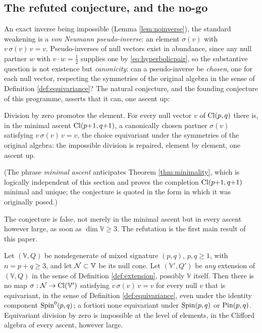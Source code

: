 \subsection{The refuted conjecture, and the no-go}\label{sec:nogo}

An exact inverse being impossible (Lemma \ref{lem:noinverse}), the standard weakening is a \emph{von Neumann pseudo-inverse}: an element $\sigma(v)$ with $v\,\sigma(v)\,v = v$. Pseudo-inverses of null vectors exist in abundance, since any null partner $w$ with $v \cdot w = \tfrac12$ supplies one by \eqref{eq:hyperbolicpair}, so the substantive question is not existence but \emph{canonicity}: can a pseudo-inverse be \emph{chosen}, one for each null vector, respecting the symmetries of the original algebra in the sense of Definition \ref{def:equivariance}? The natural conjecture, and the founding conjecture of this programme, asserts that it can, one ascent up:

\begin{conjecture}\label{conj:original}
Division by zero promotes the element. For every null vector $v$ of $\mathrm{Cl}(p,q)$ there is, in the minimal ascent $\mathrm{Cl}(p{+}1,q{+}1)$, a canonically chosen partner $\sigma(v)$ satisfying $v\,\sigma(v)\,v = v$, the choice equivariant under the symmetries of the original algebra: the impossible division is repaired, element by element, one ascent up.
\end{conjecture}

(The phrase \emph{minimal ascent} anticipates Theorem \ref{thm:minimality}, which is logically independent of this section and proves the completion $\mathrm{Cl}(p{+}1,q{+}1)$ minimal and unique; the conjecture is quoted in the form in which it was originally posed.)

The conjecture is false, not merely in the minimal ascent but in every ascent however large, as soon as $\dim \mathbb{V} \geq 3$. The refutation is the first main result of this paper.

\begin{theorem}\label{thm:nogo}
Let $(\mathbb{V}, Q)$ be nondegenerate of mixed signature $(p,q)$, $p, q \geq 1$, with $n = p + q \geq 3$, and let $\mathcal{N} \subset \mathbb{V}$ be its null cone. Let $(\mathbb{V}', Q')$ be \emph{any} extension of $(\mathbb{V}, Q)$ in the sense of Definition \ref{def:extension}, possibly $\mathbb{V}$ itself. Then there is no map $\sigma : \mathcal{N} \to \mathrm{Cl}(\mathbb{V}')$ satisfying $v\,\sigma(v)\,v = v$ for every null $v$ that is equivariant, in the sense of Definition \ref{def:equivariance}, even under the identity component $\mathrm{Spin}^0(p,q)$; a fortiori none equivariant under $\mathrm{Spin}(p,q)$ or $\mathrm{Pin}(p,q)$. Equivariant division by zero is impossible at the level of elements, in the Clifford algebra of every ascent, however large.
\end{theorem}

